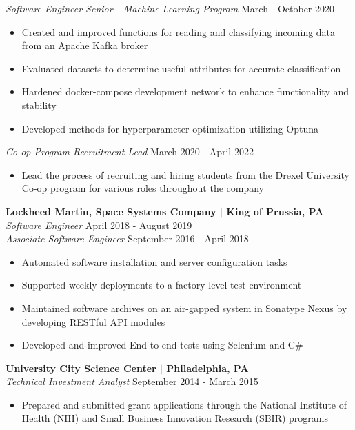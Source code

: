 \documentclass[line,resmargin]{res}
\begin{document}
\begin{resume}
{\sl Software Engineer Senior - Machine Learning Program} \hfill March - October 2020
	\begin{itemize} \itemsep -2pt
		\item Created and improved functions for reading and classifying incoming data from an Apache Kafka broker
		\item Evaluated datasets to determine useful attributes for accurate classification
		\item Hardened docker-compose development network to enhance functionality and stability
		\item Developed methods for hyperparameter optimization utilizing Optuna
	\end{itemize}
	
{\sl Co-op Program Recruitment Lead} \hfill March 2020 - April 2022
	\begin{itemize} \itemsep -2pt
		\item Lead the process of recruiting and hiring students from the Drexel University Co-op program for various roles throughout the company
	\end{itemize}

\textbf{Lockheed Martin, Space Systems Company $|$ King of Prussia, PA} \\
{\sl Software Engineer} \hfill April 2018 - August 2019 \\
{\sl Associate Software Engineer} \hfill September 2016 - April 2018
	\begin{itemize}  \itemsep -2pt
		\item Automated software installation and server configuration tasks
		\item Supported weekly deployments to a factory level test environment
		\item Maintained software archives on an air-gapped system in Sonatype Nexus by developing RESTful API modules
		\item Developed and improved End-to-end tests using Selenium and C\#
	\end{itemize}
				
\textbf{University City Science Center $|$ Philadelphia, PA} \\
{\sl Technical Investment Analyst} \hfill September 2014 - March 2015 
	\begin{itemize} \itemsep -2pt
		\item Prepared and submitted grant applications through the National Institute of Health (NIH) and Small Business Innovation Research (SBIR) programs
	\end{itemize}
				

\end{resume}
\end{document}
